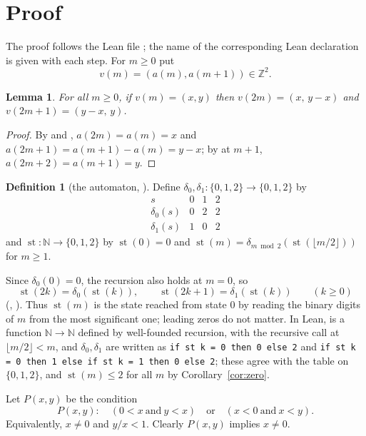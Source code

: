 \documentclass[11pt]{amsart}
\theoremstyle{plain}
\newtheorem{lemma}[theorem]{Lemma}
\theoremstyle{definition}
\newtheorem{definition}[theorem]{Definition}
\newcommand{\N}{\mathbb{N}}
\newcommand{\Z}{\mathbb{Z}}
\newcommand{\st}{\operatorname{st}}
\begin{document}
\section{Proof}\label{sec:proof}

The proof follows the Lean file ; the name of the corresponding Lean declaration is given with each step. For $m\ge0$ put
\[
  v(m)=(a(m),a(m+1))\in\Z^2 .
\]

\begin{lemma}\label{lem:vec}
For all $m\ge0$, if $v(m)=(x,y)$ then $v(2m)=(x,\,y-x)$ and $v(2m+1)=(y-x,\,y)$.
\end{lemma}

\begin{proof}
By  and , $a(2m)=a(m)=x$ and $a(2m+1)=a(m+1)-a(m)=y-x$; by  at $m+1$, $a(2m+2)=a(m+1)=y$.
\end{proof}

\begin{definition}[the automaton, ]\label{def:st}
Define $\delta_0,\delta_1\colon\{0,1,2\}\to\{0,1,2\}$ by
\[
\begin{array}{c|ccc}
 s & 0 & 1 & 2\\\hline
 \delta_0(s) & 0 & 2 & 2\\
 \delta_1(s) & 1 & 0 & 2
\end{array}
\]
and $\st\colon\N\to\{0,1,2\}$ by $\st(0)=0$ and $\st(m)=\delta_{m\bmod 2}(\st(\lfloor m/2\rfloor))$ for $m\ge1$.
\end{definition}

Since $\delta_0(0)=0$, the recursion also holds at $m=0$, so
\begin{equation}\label{eq:st}
  \st(2k)=\delta_0(\st(k)),\qquad \st(2k+1)=\delta_1(\st(k))\qquad(k\ge0)
\end{equation}
(, ).
Thus $\st(m)$ is the state reached from state $0$ by reading the binary digits of $m$ from the most significant one; leading zeros do not matter.
In Lean,  is a function $\N\to\N$ defined by well-founded recursion, with the recursive call at $\lfloor m/2\rfloor<m$, and $\delta_0,\delta_1$ are written as \texttt{if st k = 0 then 0 else 2} and \texttt{if st k = 0 then 1 else if st k = 1 then 0 else 2}; these agree with the table on $\{0,1,2\}$, and $\st(m)\le2$ for all $m$ by Corollary~\ref{cor:zero}.

Let $P(x,y)$ be the condition
\[
  P(x,y)\colon\quad (0<x\ \text{and}\ y<x)\quad\text{or}\quad(x<0\ \text{and}\ x<y).
\]
Equivalently, $x\ne0$ and $y/x<1$. Clearly $P(x,y)$ implies $x\ne0$.
\end{document}
